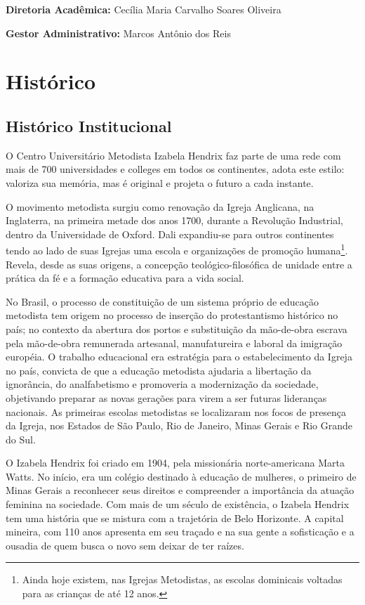 \documentclass[a4paper, 12pt, openright, oneside, german, french, english, brazil]{abntex2}
\begin{document}
\textbf{Diretoria Acadêmica:} Cecília Maria Carvalho Soares Oliveira

\textbf{Gestor Administrativo:} Marcos Antônio dos Reis


\chapter{Histórico}

\section{Histórico Institucional}

O Centro Universitário Metodista Izabela Hendrix faz parte de uma rede com mais de 700 universidades e colleges em todos os continentes, adota este estilo: valoriza sua memória, mas é original e projeta o futuro a cada instante.

O movimento metodista surgiu como renovação da Igreja Anglicana, na Inglaterra, na primeira metade dos anos 1700, durante a Revolução Industrial, dentro da Universidade de Oxford. Dali expandiu-se para outros continentes tendo ao lado de suas Igrejas uma escola e organizações de promoção humana\footnote{Ainda hoje existem, nas Igrejas Metodistas, as escolas dominicais voltadas para as crianças de até 12 anos.}. Revela, desde as suas origens, a concepção teológico-filosófica de unidade entre a prática da fé e a formação educativa para a vida social.

No Brasil, o processo de constituição de um sistema próprio de educação metodista tem origem no processo de inserção do protestantismo histórico no país; no contexto da abertura dos portos e substituição da mão-de-obra escrava pela mão-de-obra remunerada artesanal, manufatureira e laboral da imigração européia. O trabalho educacional era estratégia para o estabelecimento da Igreja no país, convicta de que a educação metodista ajudaria a libertação da ignorância, do analfabetismo e promoveria a modernização da sociedade, objetivando preparar as novas gerações para virem a ser futuras lideranças nacionais. As primeiras escolas metodistas se localizaram nos focos de presença da Igreja, nos Estados de São Paulo, Rio de Janeiro, Minas Gerais e Rio Grande do Sul.

O Izabela Hendrix foi criado em 1904, pela missionária norte-americana Marta Watts. No início, era um colégio destinado à educação de mulheres, o primeiro de Minas Gerais a reconhecer seus direitos e compreender a importância da atuação feminina na sociedade. Com mais de um século de existência, o Izabela Hendrix tem uma história que se mistura com a trajetória de Belo Horizonte. A capital mineira, com 110 anos apresenta em seu traçado e na sua gente a sofisticação e a ousadia de quem busca o novo sem deixar de ter raízes.
\end{document}
